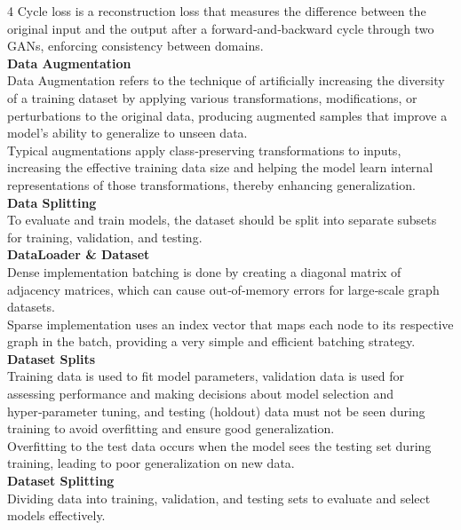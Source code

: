 \documentclass[8pt]{extarticle}
\begin{document}
\begin{multicols}{4}
Cycle loss is a reconstruction loss that measures the difference between the original input and the output after a forward‑and‑backward cycle through two GANs, enforcing consistency between domains.\\
\vspace{2pt}\textbf{Data Augmentation}\\
Data Augmentation refers to the technique of artificially increasing the diversity of a training dataset by applying various transformations, modifications, or perturbations to the original data, producing augmented samples that improve a model’s ability to generalize to unseen data.\\
Typical augmentations apply class‑preserving transformations to inputs, increasing the effective training data size and helping the model learn internal representations of those transformations, thereby enhancing generalization.\\
\vspace{2pt}\textbf{Data Splitting}\\
To evaluate and train models, the dataset should be split into separate subsets for training, validation, and testing.\\
\vspace{2pt}\textbf{DataLoader \& Dataset}\\
Dense implementation batching is done by creating a diagonal matrix of adjacency matrices, which can cause out‑of‑memory errors for large‑scale graph datasets.\\
Sparse implementation uses an index vector that maps each node to its respective graph in the batch, providing a very simple and efficient batching strategy.\\
\vspace{2pt}\textbf{Dataset Splits}\\
Training data is used to fit model parameters, validation data is used for assessing performance and making decisions about model selection and hyper‑parameter tuning, and testing (holdout) data must not be seen during training to avoid overfitting and ensure good generalization.\\
Overfitting to the test data occurs when the model sees the testing set during training, leading to poor generalization on new data.\\
\vspace{2pt}\textbf{Dataset Splitting}\\
Dividing data into training, validation, and testing sets to evaluate and select models effectively.\\

\end{multicols}
\end{document}

